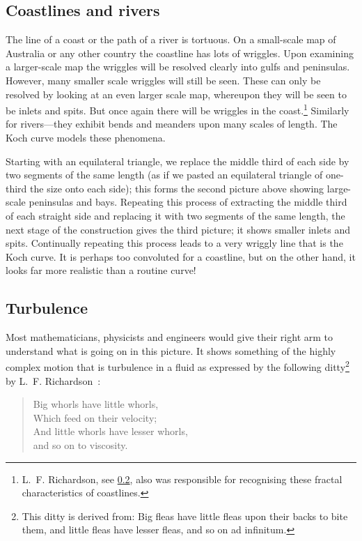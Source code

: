 \subsection{Coastlines and rivers}
\label{sscoast}

The line of a coast or the path of a river is tortuous.  On a 
small-scale map of Australia or any other country the coastline has 
lots of wriggles.  Upon examining a larger-scale map the wriggles will 
be resolved clearly into gulfs and peninsulas.  However, many smaller 
scale wriggles will still be seen.  These can only be resolved by 
looking at an even larger scale map, whereupon they will be seen to be 
inlets and spits.  But once again there will be wriggles in the 
coast.\footnote{L.~F. Richardson, see \cref{ssturb}, also was 
responsible for recognising these fractal characteristics of 
coastlines.} Similarly for rivers---they exhibit bends and meanders 
upon many scales of length.  The Koch curve models these phenomena.

Starting with an equilateral triangle, we replace the middle third of 
each side by two segments of the same length (as if we pasted an 
equilateral triangle of one-third the size onto each side); this 
forms the second picture above showing large-scale peninsulas and 
bays.  Repeating this process of extracting the middle third of each 
straight side and replacing it with two segments of the same length, 
the next stage of the construction gives the third picture; it shows 
smaller inlets and spits.  Continually repeating this process leads 
to a very wriggly line that is the Koch curve.  It is perhaps too 
convoluted for a coastline, but on the other hand, it looks far more 
realistic than a routine curve!

\subsection{Turbulence}
\label{ssturb}

Most mathematicians, physicists and engineers would give their right 
arm to understand what is going on in this picture.  It shows 
something of the highly complex motion that is turbulence in a fluid 
as expressed by the following ditty\footnote{This ditty is derived 
from: Big fleas have little fleas upon their backs to bite them, and 
little fleas have lesser fleas, and so on ad infinitum.} by 
L.~F. Richardson~\cite{Rich}:
\begin{verse}
	Big whorls have little whorls,\\
	Which feed on their velocity;\\
	And little whorls have lesser whorls,\\
	and so on to viscosity.
\end{verse}

